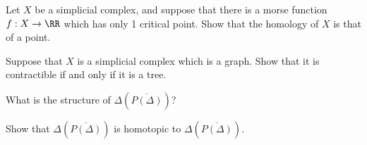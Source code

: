 \begin{exercise}
Let $X$ be a simplicial complex, and suppose that there is a morse function $f: X\to \RR$ which has only 1 critical point. Show that the homology of $X$ is that of a point. 
\end{exercise}

\begin{exercise}
Suppose that $X$ is a simplicial complex which is a graph. Show that it is contractible if and only if it is a tree. 
\end{exercise}


\begin{exercise}
What is the structure of $\Delta(\overline {P(\Delta)})$?
\end{exercise}

\begin{exercise}
Show that $\Delta(\overline{P(\Delta)})$ is homotopic to $\Delta(\overline{P(\Delta)})$.  
\end{exercise}